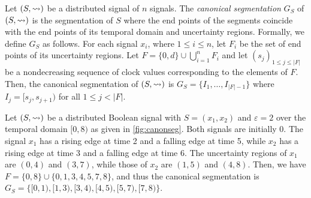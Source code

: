 
Let $(S,{\rightsquigarrow})$ be a distributed signal of $n$ signals.
The \emph{canonical segmentation} $G_S$ of $(S,{\rightsquigarrow})$ is the segmentation of $S$ where the end points of the segments coincide with the end points of its temporal domain and uncertainty regions.
Formally, we define $G_S$ as follows.
For each signal $x_i$, where $1 \leq i \leq n$, let $F_i$ be the set of end points of its 
uncertainty regions.
%
Let $F = \{0, d\} \cup \bigcup_{i = 1}^{n} F_i$ and let $(s_j)_{1 
\leq j \leq |F|}$ be a nondecreasing sequence of clock values corresponding to the elements of $F$.
Then, the canonical segmentation of $(S,{\rightsquigarrow})$ is $G_S = \{I_1, \ldots, I_{|F| - 1}\}$ where $I_j = [s_j, s_{j+1})$ for all $1 \leq j < |F|$.



\begin{example} \label{ex:canonseg}
	Let $(S, {\rightsquigarrow})$ be a distributed Boolean signal with $S = (x_1, x_2)$ and $\varepsilon = 2$ over 
	the temporal domain $[0,8)$ as given in \cref{fig:canonseg}.
	Both signals are initially 0.
	The signal $x_1$ has a rising edge at time 2 and a falling edge at time 5, while $x_2$ has a rising edge at time 3 and a falling edge at time 6.
	The uncertainty regions of $x_1$ are $(0,4)$ and $(3,7)$, while those of $x_2$ are $(1,5)$ and $(4,8)$.
	Then, we have $F = \{0, 8\} \cup \{0, 1, 3, 4, 5, 7, 8\}$, and thus the canonical segmentation is $G_S = \{ [0,1), [1,3), [3,4), [4,5), [5,7), [7,8) \}$.
\end{example}




